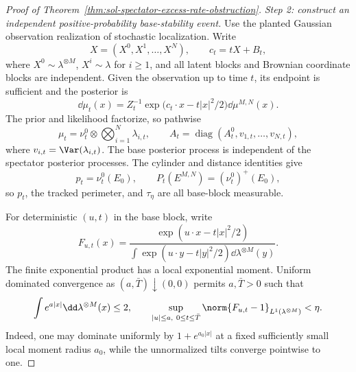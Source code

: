 \documentclass[../main.tex]{subfiles}
\begin{document}
\begin{proof}[Proof of Theorem~\ref{thm:sol-spectator-excess-rate-obstruction}]
\emph{Step 2: construct an independent positive-probability base-stability event.}
Use the planted Gaussian observation realization of stochastic localization.  Write
\[
  X=(X^0,X^1,\ldots,X^N),
  \qquad
  c_t=tX+B_t,
\]
where $X^0\sim\lambda^{\otimes M}$, $X^i\sim\lambda$ for $i\ge1$, and all latent blocks and
Brownian coordinate blocks are independent.  Given the observation up to time $t$, its
endpoint is sufficient and the posterior is
\[
  \dd\mu_t(x)=Z_t^{-1}
  \exp\bigl(c_t\cdot x-t|x|^2/2\bigr)\dd\mu^{M,N}(x).
\]
The prior and likelihood factorize, so pathwise
\begin{equation}
  \mu_t=\nu_t^0\otimes\bigotimes_{i=1}^N\lambda_{i,t},
  \qquad
  A_t=\operatorname{diag}(A_t^0,v_{1,t},\ldots,v_{N,t}),
  \label{eq:sol-spectator-rate-factorization}
\end{equation}
where $v_{i,t}=\Var(\lambda_{i,t})$.  The base posterior process is independent of the
spectator posterior processes.  The cylinder and distance identities give
\begin{equation}
  p_t=\nu_t^0(E_0),
  \qquad
  P_t(E^{M,N})=(\nu_t^0)^+(E_0),
  \label{eq:sol-spectator-rate-localized-cylinder}
\end{equation}
so $p_t$, the tracked perimeter, and $\tau_\eta$ are all base-block measurable.

For deterministic $(u,t)$ in the base block, write
\[
  F_{u,t}(x)=
  \frac{\exp(u\cdot x-t|x|^2/2)}
       {\int\exp(u\cdot y-t|y|^2/2)\dd\lambda^{\otimes M}(y)}.
\]
The finite exponential product has a local exponential moment.  Uniform dominated convergence
as $(a,\bar T)\downarrow(0,0)$ permits $a,\bar T>0$ such that
\begin{equation}
  \int e^{a|x|}\dd\lambda^{\otimes M}(x)\le2,
  \qquad
  \sup_{|u|\le a,\ 0\le t\le\bar T}
  \norm{F_{u,t}-1}_{L^1(\lambda^{\otimes M})}<\eta.
  \label{eq:sol-spectator-rate-l1-stability}
\end{equation}
Indeed, one may dominate uniformly by $1+e^{a_0|x|}$ at a fixed sufficiently small local
moment radius $a_0$, while the unnormalized tilts converge pointwise to one.


\end{proof}
\end{document}
